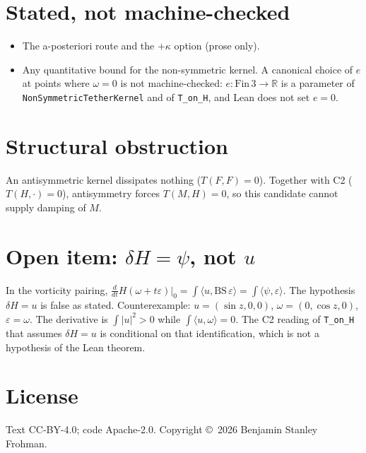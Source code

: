 \documentclass[11pt]{article}
\begin{document}
\section{Stated, not machine-checked}
\begin{itemize}
\item The a-posteriori route and the $+\kappa$ option (prose only).
\item Any quantitative bound for the non-symmetric kernel. A canonical choice of $e$ at points where $\omega=0$ is not machine-checked: $e:\mathrm{Fin}\,3\to\mathbb{R}$ is a parameter of \texttt{NonSymmetricTetherKernel} and of \texttt{T\_on\_H}, and Lean does not set $e=0$.
\end{itemize}
\section{Structural obstruction}
An antisymmetric kernel dissipates nothing ($T(F,F)=0$). Together with C2 ($T(H,\cdot)=0$), antisymmetry forces $T(M,H)=0$, so this candidate cannot supply damping of $M$.
\section{Open item: \texorpdfstring{$\delta H=\psi$, not $u$}{delta H = psi, not u}}
In the vorticity pairing, $\frac{d}{dt}H(\omega+t\varepsilon)|_0=\int\langle u,\mathrm{BS}\,\varepsilon\rangle=\int\langle\psi,\varepsilon\rangle$. The hypothesis $\delta H=u$ is false as stated. Counterexample: $u=(\sin z,0,0)$, $\omega=(0,\cos z,0)$, $\varepsilon=\omega$. The derivative is $\int|u|^2>0$ while $\int\langle u,\omega\rangle=0$. The C2 reading of \texttt{T\_on\_H} that assumes $\delta H=u$ is conditional on that identification, which is not a hypothesis of the Lean theorem.
\section*{License}
Text CC-BY-4.0; code Apache-2.0. Copyright \copyright\ 2026 Benjamin Stanley Frohman.
\end{document}
